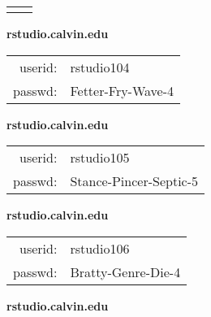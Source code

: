 \documentclass{article}\usepackage[]{graphicx}\usepackage[]{color}
\begin{document}
\begin{multicols}{3}
\begin{minipage}{.3\textwidth}
\begin{tabular}{rl}
\vspace{5mm}

\end{tabular}\end{minipage}

\vspace{5mm}

\begin{minipage}{.3\textwidth}
\centerline{\textbf{rstudio.calvin.edu}}
\medskip
\begin{tabular}{rl}

userid: & rstudio104\\
passwd: & Fetter-Fry-Wave-4

\vspace{5mm}

\end{tabular}\end{minipage}

\vspace{5mm}

\begin{minipage}{.3\textwidth}
\centerline{\textbf{rstudio.calvin.edu}}
\medskip
\begin{tabular}{rl}

userid: & rstudio105\\
passwd: & Stance-Pincer-Septic-5

\vspace{5mm}

\end{tabular}\end{minipage}

\vspace{5mm}

\begin{minipage}{.3\textwidth}
\centerline{\textbf{rstudio.calvin.edu}}
\medskip
\begin{tabular}{rl}

userid: & rstudio106\\
passwd: & Bratty-Genre-Die-4

\vspace{5mm}

\end{tabular}\end{minipage}

\vspace{5mm}

\begin{minipage}{.3\textwidth}
\centerline{\textbf{rstudio.calvin.edu}}
\medskip
\begin{tabular}{rl}


\end{tabular}
\end{minipage}
\end{multicols}
\end{document}
